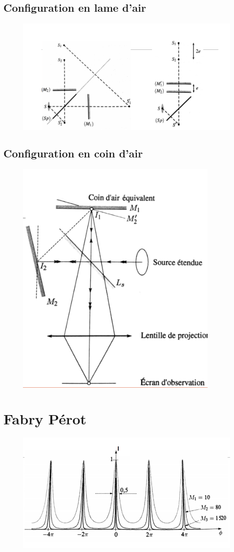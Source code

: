 \documentclass[10pt]{beamer}
\begin{document}
\subsection{Configuration en lame d'air}

\begin{frame}{\insertsubsection}
    \begin{figure}
        \centering
        \includegraphics[width=1\textwidth]{LameDair.png}
    \end{figure}
\end{frame}
\subsection{Configuration en coin d'air}
\begin{frame}{\insertsubsection}
    \begin{figure}
        \centering
        \includegraphics[width=.6\textwidth]{coindair.png}
    \end{figure}
\end{frame}
\section{Fabry Pérot}

\begin{frame}{\insertsection}
    \begin{figure}
        \centering
        \includegraphics[width=.6\textwidth]{FP.png}
    \end{figure}
\end{frame}
\end{document}
